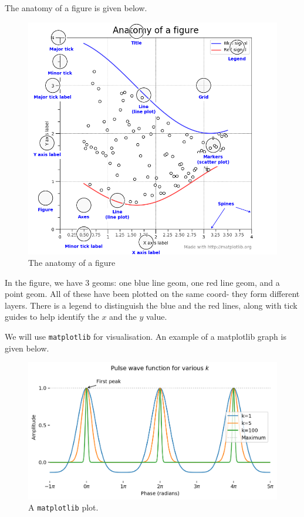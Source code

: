 \documentclass[a4paper, openany]{memoir}
\begin{document}
The anatomy of a figure is given below.
\begin{figure}[H]
    \centering
    \includegraphics[scale=0.5]{src/2.3 anatomy of a figure.png}
    \caption{The anatomy of a figure}
\end{figure}
\noindent In the figure, we have 3 geoms: one blue line geom, one red line geom, and a point geom. All of these have been plotted on the same coord- they form different layers. There is a legend to distinguish the blue and the red lines, along with tick guides to help identify the $x$ and the $y$ value.

We will use \texttt{matplotlib} for visualisation. An example of a matplotlib graph is given below.
\begin{figure}[H]
    \centering
    \includegraphics[scale=0.55]{src/2.4 example matplotlib plot.png}
    \caption{A \texttt{matplotlib} plot.}
\end{figure}
\newpage
\end{document}
